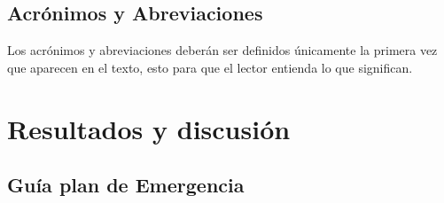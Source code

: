     
    \subsection{Acrónimos y Abreviaciones}
    
    Los acrónimos y abreviaciones deberán ser definidos únicamente la primera vez que aparecen en el texto, esto para que el lector entienda lo que significan.
    
    
    
    \section{Resultados y discusión}
    
    \subsection{Guía plan de Emergencia}
    
